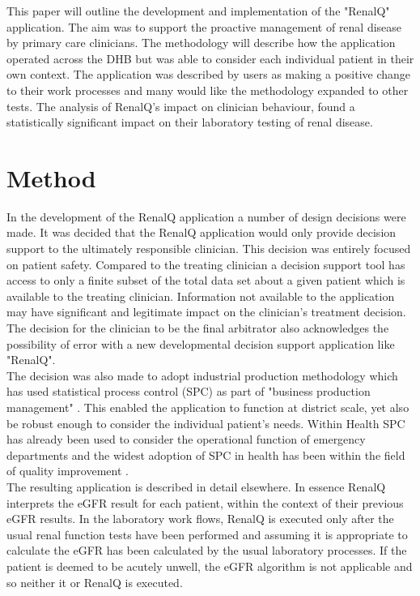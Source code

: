 \documentclass[11pt]{article}
\begin{document}
This paper will outline the development and implementation of the "RenalQ" application. The aim was to support the proactive management of renal disease by primary care clinicians. The methodology will describe how the application operated across the DHB but was able to consider each individual patient in their own context.  The application was described by users as making a positive change to their work processes and many would like the methodology expanded to other tests. The analysis of RenalQ's impact on clinician behaviour, found a statistically significant impact on their laboratory testing of renal disease.\\

\section{Method}

In the development of the RenalQ application a number of design decisions were made. It was decided that the RenalQ application would only provide decision support to the ultimately responsible clinician. This decision was entirely focused on patient safety. Compared to the treating clinician a decision support tool has access to only a finite subset of the total data set about a given patient which is available to the treating clinician. Information not available to the application may have significant and legitimate impact on the clinician's treatment decision.  The decision for the clinician to be the final arbitrator also acknowledges the possibility of error with a new developmental decision support application like "RenalQ". \\

The decision was also made to adopt industrial production methodology which has used statistical process control (SPC) as part of "business production management" \citep{rosemann2015six, cheng2015run, epprecht2015statistical}. This enabled the application to function at district scale, yet also be robust enough to consider the individual patient's needs. Within Health SPC has already been used to consider the operational function of emergency departments \citep{pimentel2015statistical} and the widest adoption of SPC in health has been within the field of quality improvement \citep{provost2011health}.\\

The resulting application is described in detail elsewhere\citep{GodfreyEtAl2014KidneyPaper}. In essence RenalQ interprets the eGFR result for each patient, within the context of their previous eGFR results. In the laboratory work flows, RenalQ is executed only after the usual renal function tests have been performed and assuming it is appropriate to calculate the eGFR has been calculated by the usual laboratory processes. If the patient is deemed to be acutely unwell, the eGFR algorithm is not applicable and so neither it or RenalQ is executed.\\
\end{document}
